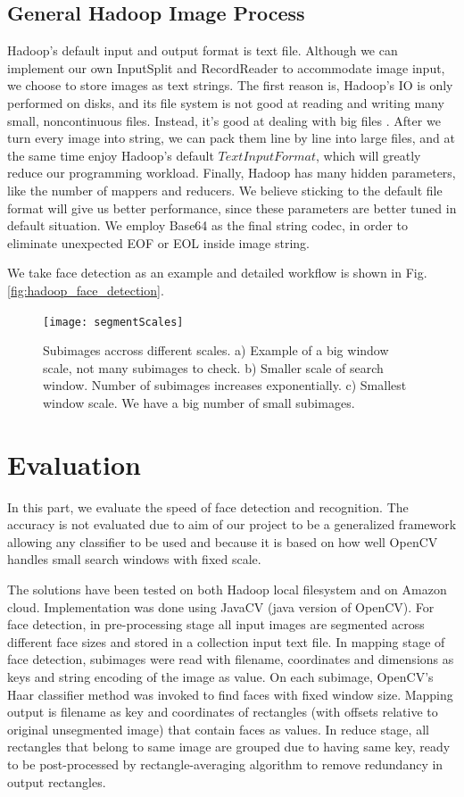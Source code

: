 \documentclass[11pt, draftclsnofoot, onecolumn]{IEEEtran}
\begin{document}
\subsection {General Hadoop Image Process}

Hadoop's default input and output format is text file. Although we can implement our own InputSplit and RecordReader to accommodate image input, we choose to store images as text strings. The first reason is, Hadoop's IO is only performed on disks, and its file system is not good at reading and writing many small, noncontinuous files. Instead, it's good at dealing with big files \cite{sweeney2011hipi}. After we turn every image into string, we can pack them line by line into large files, and at the same time enjoy Hadoop's default $TextInputFormat$, which will greatly reduce our programming workload. Finally, Hadoop has many hidden parameters, like the number of mappers and reducers. We believe sticking to the default file format will give us better performance, since these parameters are better tuned in default situation. We employ Base64 as the final string codec, in order to eliminate unexpected EOF or EOL inside image string.

We take face detection as an example and detailed workflow is shown in Fig. \ref{fig:hadoop_face_detection}.

\begin{figure}[t!]
\centering
\texttt{[image: segmentScales]}
\caption{Subimages accross different scales. a) Example of a big window scale, not many subimages to check. b) Smaller scale of search window. Number of subimages increases exponentially. c) Smallest window scale. We have a big number of small subimages. }
\end{figure}

\section{Evaluation} \label{sec:evaluation}

In this part, we evaluate the speed of face detection and recognition. The accuracy is not evaluated due to aim of our project to be a generalized framework allowing any classifier to be used and because it is based on how well OpenCV handles small search windows with fixed scale.

The solutions have been tested on both Hadoop local filesystem and on Amazon cloud. Implementation was done using JavaCV (java version of OpenCV). For face detection, in pre-processing stage all input images are segmented across different face sizes and stored in a collection input text file. In mapping stage of face detection, subimages were read with filename, coordinates and dimensions as keys and string encoding of the image as value. On each subimage, OpenCV's Haar classifier method was invoked to find faces with fixed window size. Mapping output is filename as key and coordinates of rectangles (with offsets relative to original unsegmented image) that contain faces as values. In reduce stage, all rectangles that belong to same image are grouped due to having same key, ready to be post-processed by rectangle-averaging algorithm to remove redundancy in output rectangles.
\end{document}
